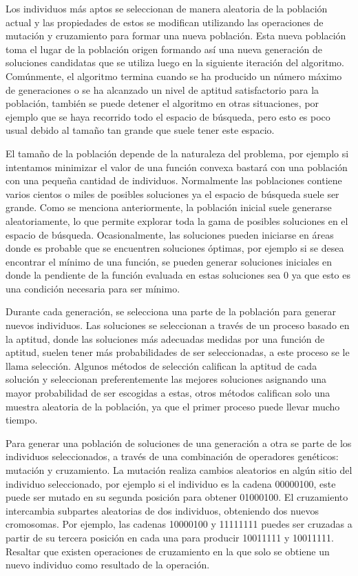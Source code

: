 Los individuos más aptos se seleccionan de manera aleatoria de la población actual y las propiedades de estos se modifican utilizando las operaciones de mutación y cruzamiento para formar una nueva población. Esta nueva población toma el lugar de la población origen formando así una nueva generación de soluciones candidatas que se utiliza luego en la siguiente iteración del algoritmo. Comúnmente, el algoritmo termina cuando se ha producido un número máximo de generaciones o se ha alcanzado un nivel de aptitud satisfactorio para la población, también se puede detener el algoritmo en otras situaciones, por ejemplo que se haya recorrido todo el espacio de búsqueda, pero esto es poco usual debido al tamaño tan grande que suele tener este espacio.

El tamaño de la población depende de la naturaleza del problema, por ejemplo si intentamos minimizar el valor de una función convexa bastará con una población con una pequeña cantidad de individuos. Normalmente las poblaciones contiene varios cientos o miles de posibles soluciones ya el espacio de búsqueda suele ser grande. Como se menciona anteriormente, la población inicial suele generarse aleatoriamente, lo que permite explorar toda la gama de posibles soluciones en el espacio de búsqueda. Ocasionalmente, las soluciones pueden iniciarse en áreas donde es probable que se encuentren soluciones óptimas, por ejemplo si se desea encontrar el mínimo de una función, se pueden generar soluciones iniciales en donde la pendiente de la función evaluada en estas soluciones sea $0$ ya que esto es una condición necesaria para ser mínimo.

Durante cada generación, se selecciona una parte de la población para generar nuevos individuos. Las soluciones se seleccionan a través de un proceso basado en la aptitud, donde las soluciones más adecuadas medidas por una función de aptitud, suelen tener más probabilidades de ser seleccionadas, a este proceso se le llama selección. Algunos métodos de selección califican la aptitud de cada solución y seleccionan preferentemente las mejores soluciones asignando una mayor probabilidad de ser escogidas a estas, otros métodos califican solo una muestra aleatoria de la población, ya que el primer proceso puede llevar mucho tiempo.

Para generar una población de soluciones de una generación a otra se parte de los individuos seleccionados, a través de una combinación de operadores genéticos: mutación y cruzamiento. La mutación realiza cambios aleatorios en algún sitio del individuo seleccionado, por ejemplo si el individuo es la cadena 00000100, este puede ser mutado en su segunda posición para obtener 01000100. El cruzamiento intercambia subpartes aleatorias de dos individuos, obteniendo dos nuevos cromosomas. Por ejemplo, las cadenas 10000100 y 11111111 puedes ser cruzadas a partir de su tercera posición en cada una para producir 10011111 y 10011111. Resaltar que existen operaciones de cruzamiento en la que solo se obtiene un nuevo individuo como resultado de la operación.

